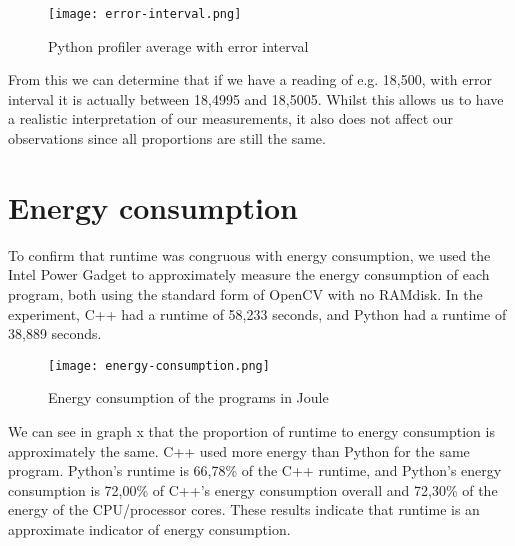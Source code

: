 \begin{figure}[H]
	\centering
	\texttt{[image: error-interval.png]}
	\caption{Python profiler average with error interval}
	\label{figure:error-interval}
\end{figure}

From this we can determine that if we have a reading of e.g. 18,500, with error interval it is actually between 18,4995 and 18,5005. Whilst this allows us to have a realistic interpretation of our measurements, it also does not affect our observations since all proportions are still the same.

\section{Energy consumption}
To confirm that runtime was congruous with energy consumption, we used the Intel Power Gadget to approximately measure the energy consumption of each program, both using the standard form of OpenCV with no RAMdisk. In the experiment, C++ had a runtime of 58,233 seconds, and Python had a runtime of 38,889 seconds.

\begin{figure}[H]
	\centering
	\texttt{[image: energy-consumption.png]}
	\caption{Energy consumption of the programs in Joule}
	\label{figure:energy-consumption}
\end{figure}

We can see in graph x that the proportion of runtime to energy consumption is approximately the same. C++ used more energy than Python for the same program. Python’s runtime is 66,78\% of the C++ runtime, and Python’s energy consumption is 72,00\% of C++’s energy consumption overall and 72,30\% of the energy of the CPU/processor cores. These results indicate that runtime is an approximate indicator of energy consumption.
